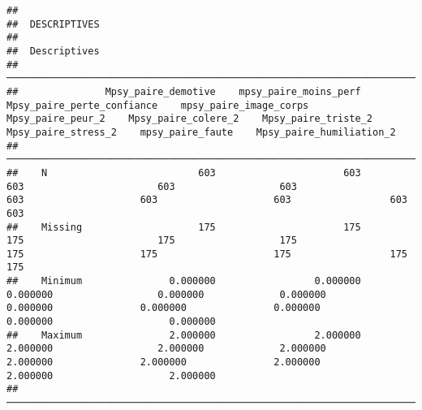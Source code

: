 \documentclass[
]{article}
\begin{document}
\begin{verbatim}
## 
##  DESCRIPTIVES
## 
##  Descriptives                                                                                                                                                                                                                                                  
##  ───────────────────────────────────────────────────────────────────────────────────────────────────────────────────────────────────────────────────────────────────────────────────────────────────────────────────────────────────────────────────────────── 
##               Mpsy_paire_demotive    mpsy_paire_moins_perf    Mpsy_paire_perte_confiance    mpsy_paire_image_corps    Mpsy_paire_peur_2    Mpsy_paire_colere_2    Mpsy_paire_triste_2    Mpsy_paire_stress_2    mpsy_paire_faute    Mpsy_paire_humiliation_2   
##  ───────────────────────────────────────────────────────────────────────────────────────────────────────────────────────────────────────────────────────────────────────────────────────────────────────────────────────────────────────────────────────────── 
##    N                          603                      603                           603                       603                  603                    603                    603                    603                 603                         603   
##    Missing                    175                      175                           175                       175                  175                    175                    175                    175                 175                         175   
##    Minimum               0.000000                 0.000000                      0.000000                  0.000000             0.000000               0.000000               0.000000               0.000000            0.000000                    0.000000   
##    Maximum               2.000000                 2.000000                      2.000000                  2.000000             2.000000               2.000000               2.000000               2.000000            2.000000                    2.000000   
##  ─────────────────────────────────────────────────────────────────────────────────────────────────────────────────────────────────────────────────────────────────────────────────────────────────────────────────────────────────────────────────────────────
\end{verbatim}
\end{document}

